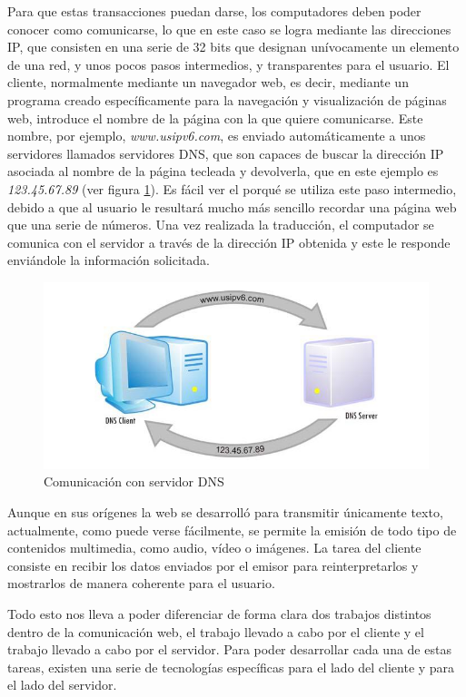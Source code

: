 Para que estas transacciones puedan darse, los computadores deben poder conocer como comunicarse, lo que en este caso se logra mediante las direcciones \ac{IP}, que consisten en una serie de 32 bits que designan unívocamente un elemento de una red, y unos pocos pasos intermedios, y transparentes para el usuario. El cliente, normalmente mediante un navegador web, es decir, mediante un programa creado específicamente para la navegación y visualización de páginas web, introduce el nombre de la página con la que quiere comunicarse. Este nombre, por ejemplo, \textit{www.usipv6.com}, es enviado automáticamente a unos servidores llamados servidores \ac{DNS}, que son capaces de buscar la dirección \ac{IP} asociada al nombre de la página tecleada y devolverla, que en este ejemplo es \textit{123.45.67.89} (ver figura \ref{fig:dns-server}). Es fácil ver el porqué se utiliza este paso intermedio, debido a que al usuario le resultará mucho más sencillo recordar una página web que una serie de números. Una vez realizada la traducción, el computador se comunica con el servidor a través de la dirección \ac{IP} obtenida y este le responde enviándole la información solicitada.

\begin{figure}[h!btp]
\centering
\includegraphics[scale=0.5, fbox={\fboxrule} 4mm]{images/03-antecedentes/11-dns_server.png}
\caption{Comunicación con servidor DNS}
\label{fig:dns-server}
\end{figure}

Aunque en sus orígenes la web se desarrolló para transmitir únicamente texto, actualmente, como puede verse fácilmente, se permite la emisión de todo tipo de contenidos multimedia, como audio, vídeo o imágenes. La tarea del cliente consiste en recibir los datos enviados por el emisor para reinterpretarlos y mostrarlos de manera coherente para el usuario.

Todo esto nos lleva a poder diferenciar de forma clara dos trabajos distintos dentro de la comunicación web, el trabajo llevado a cabo por el cliente y el trabajo llevado a cabo por el servidor. Para poder desarrollar cada una de estas tareas, existen una serie de tecnologías específicas para el lado del cliente y para el lado del servidor.


